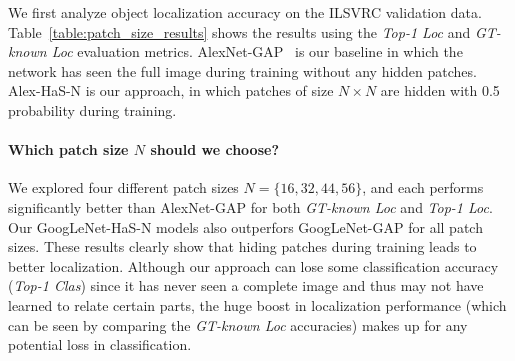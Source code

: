 \documentclass[10pt,twocolumn,letterpaper]{article}
\begin{document}
We first analyze object localization accuracy on the ILSVRC validation data. Table~\ref{table:patch_size_results} shows the results using the \emph{Top-1 Loc} and \emph{GT-known Loc} evaluation metrics.  AlexNet-GAP~\cite{zhou-cvpr2016} is our baseline in which the network has seen the full image during training without any hidden patches. Alex-HaS-N is our approach, in which patches of size $N \times N$ are hidden with 0.5 probability during training.

\vspace{-10pt}\paragraph{Which patch size $N$ should we choose?} We explored four different patch sizes $N = \{16, 32, 44, 56\}$, and each performs significantly better than AlexNet-GAP for both \emph{GT-known Loc} and \emph{Top-1 Loc}. Our GoogLeNet-HaS-N models also outperfors GoogLeNet-GAP for all patch sizes.  These results clearly show that hiding patches during training leads to better localization. Although our approach can lose some classification accuracy (\emph{Top-1 Clas}) since it has never seen a complete image and thus may not have learned to relate certain parts, the huge boost in localization performance (which can be seen by comparing the \emph{GT-known Loc} accuracies) makes up for any potential loss in classification.
\end{document}
